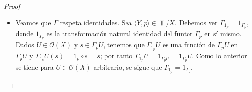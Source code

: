\begin{proof}
   \begin{itemize}
      \item Veamos que $\Gamma$ respeta identidades. Sea $\langle Y, p\rangle\in \Top /X$. Debemos ver $\Gamma_{1_{p}}=1_{\Gamma_{p}}$, donde $1_{\Gamma_{p}}$ es la transformación natural identidad del funtor $\Gamma_p$ en sí mismo. Dados $U\in \mathcal{O}(X)$ y $s\in \Gamma_p U$, tenemos que $\Gamma_{1_p} U$ es una función de $\Gamma_p U$ en $\Gamma_p U$ y $\Gamma_{1_p}U(s)=1_p\circ s=s$; por tanto $\Gamma_{1_p}U=1_{\Gamma_p U}=1_{\Gamma_p}U$. Como lo anterior se tiene para $U\in \mathcal{O}(X)$ arbitrario, se sigue que $\Gamma_{1_p}=1_{\Gamma_p}$.
   \end{itemize}
\end{proof}
